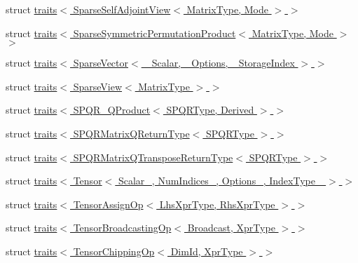 \begin{DoxyCompactItemize}
\item 
struct \hyperlink{struct_eigen_1_1internal_1_1traits_3_01_sparse_self_adjoint_view_3_01_matrix_type_00_01_mode_01_4_01_4}{traits$<$ Sparse\+Self\+Adjoint\+View$<$ Matrix\+Type, Mode $>$ $>$}
\item 
struct \hyperlink{struct_eigen_1_1internal_1_1traits_3_01_sparse_symmetric_permutation_product_3_01_matrix_type_00_01_mode_01_4_01_4}{traits$<$ Sparse\+Symmetric\+Permutation\+Product$<$ Matrix\+Type, Mode $>$ $>$}
\item 
struct \hyperlink{struct_eigen_1_1internal_1_1traits_3_01_sparse_vector_3_01___scalar_00_01___options_00_01___storage_index_01_4_01_4}{traits$<$ Sparse\+Vector$<$ \+\_\+\+Scalar, \+\_\+\+Options, \+\_\+\+Storage\+Index $>$ $>$}
\item 
struct \hyperlink{struct_eigen_1_1internal_1_1traits_3_01_sparse_view_3_01_matrix_type_01_4_01_4}{traits$<$ Sparse\+View$<$ Matrix\+Type $>$ $>$}
\item 
struct \hyperlink{struct_eigen_1_1internal_1_1traits_3_01_s_p_q_r___q_product_3_01_s_p_q_r_type_00_01_derived_01_4_01_4}{traits$<$ S\+P\+Q\+R\+\_\+\+Q\+Product$<$ S\+P\+Q\+R\+Type, Derived $>$ $>$}
\item 
struct \hyperlink{struct_eigen_1_1internal_1_1traits_3_01_s_p_q_r_matrix_q_return_type_3_01_s_p_q_r_type_01_4_01_4}{traits$<$ S\+P\+Q\+R\+Matrix\+Q\+Return\+Type$<$ S\+P\+Q\+R\+Type $>$ $>$}
\item 
struct \hyperlink{struct_eigen_1_1internal_1_1traits_3_01_s_p_q_r_matrix_q_transpose_return_type_3_01_s_p_q_r_type_01_4_01_4}{traits$<$ S\+P\+Q\+R\+Matrix\+Q\+Transpose\+Return\+Type$<$ S\+P\+Q\+R\+Type $>$ $>$}
\item 
struct \hyperlink{struct_eigen_1_1internal_1_1traits_3_01_tensor_3_01_scalar___00_01_num_indices___00_01_options___00_01_index_type___01_4_01_4}{traits$<$ Tensor$<$ Scalar\+\_\+, Num\+Indices\+\_\+, Options\+\_\+, Index\+Type\+\_\+ $>$ $>$}
\item 
struct \hyperlink{struct_eigen_1_1internal_1_1traits_3_01_tensor_assign_op_3_01_lhs_xpr_type_00_01_rhs_xpr_type_01_4_01_4}{traits$<$ Tensor\+Assign\+Op$<$ Lhs\+Xpr\+Type, Rhs\+Xpr\+Type $>$ $>$}
\item 
struct \hyperlink{struct_eigen_1_1internal_1_1traits_3_01_tensor_broadcasting_op_3_01_broadcast_00_01_xpr_type_01_4_01_4}{traits$<$ Tensor\+Broadcasting\+Op$<$ Broadcast, Xpr\+Type $>$ $>$}
\item 
struct \hyperlink{struct_eigen_1_1internal_1_1traits_3_01_tensor_chipping_op_3_01_dim_id_00_01_xpr_type_01_4_01_4}{traits$<$ Tensor\+Chipping\+Op$<$ Dim\+Id, Xpr\+Type $>$ $>$}

\end{DoxyCompactItemize}

